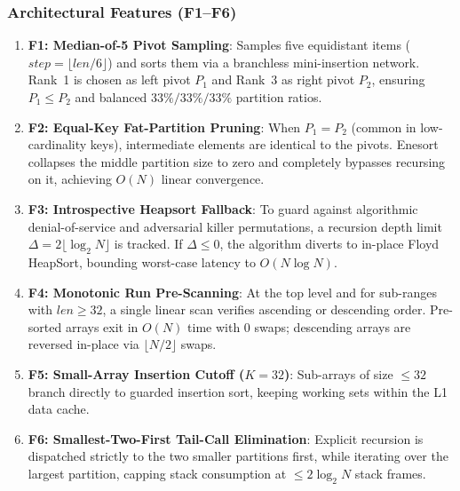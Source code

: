 \documentclass[journal]{IEEEtran}
\begin{document}
\subsubsection{Architectural Features (F1--F6)}
\begin{enumerate}
    \item \textbf{F1: Median-of-5 Pivot Sampling}: Samples five equidistant items ($step = \lfloor len / 6 \rfloor$) and sorts them via a branchless mini-insertion network. Rank~1 is chosen as left pivot $P_1$ and Rank~3 as right pivot $P_2$, ensuring $P_1 \le P_2$ and balanced $33\% / 33\% / 33\%$ partition ratios.
    \item \textbf{F2: Equal-Key Fat-Partition Pruning}: When $P_1 = P_2$ (common in low-cardinality keys), intermediate elements are identical to the pivots. Enesort collapses the middle partition size to zero and completely bypasses recursing on it, achieving $O(N)$ linear convergence.
    \item \textbf{F3: Introspective Heapsort Fallback}: To guard against algorithmic denial-of-service and adversarial killer permutations, a recursion depth limit $\Delta = 2 \lfloor \log_2 N \rfloor$ is tracked. If $\Delta \le 0$, the algorithm diverts to in-place Floyd HeapSort, bounding worst-case latency to $O(N \log N)$.
    \item \textbf{F4: Monotonic Run Pre-Scanning}: At the top level and for sub-ranges with $len \ge 32$, a single linear scan verifies ascending or descending order. Pre-sorted arrays exit in $O(N)$ time with 0 swaps; descending arrays are reversed in-place via $\lfloor N/2 \rfloor$ swaps.
    \item \textbf{F5: Small-Array Insertion Cutoff ($K=32$)}: Sub-arrays of size $\le 32$ branch directly to guarded insertion sort, keeping working sets within the L1 data cache.
    \item \textbf{F6: Smallest-Two-First Tail-Call Elimination}: Explicit recursion is dispatched strictly to the two smaller partitions first, while iterating over the largest partition, capping stack consumption at $\le 2 \log_2 N$ stack frames.
\end{enumerate}
\end{document}
